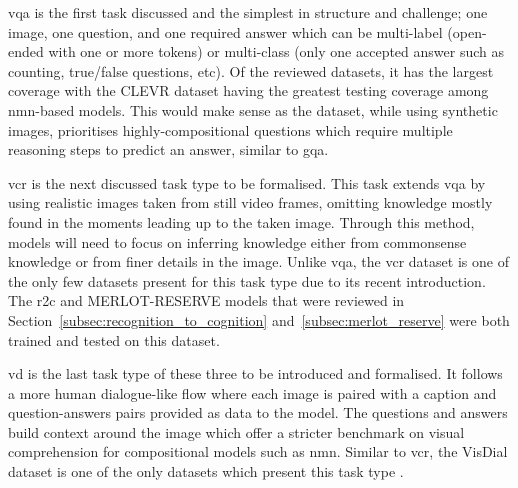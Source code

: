 \gls{vqa} is the first task discussed and the simplest in structure and challenge; one image, one question, and one required answer which can be multi-label (open-ended with one or more tokens) or multi-class (only one accepted answer such as counting, true/false questions, etc).
Of the reviewed datasets, it has the largest coverage \cite{andreas_deep_2016,agrawal_vqa_2016,johnson_clevr_2016,hudson_gqa_2019} with the CLEVR dataset having the greatest testing coverage among \gls{nmn}-based models\cite{fishandi_neural_2023}.
This would make sense as the dataset, while using synthetic images, prioritises highly-compositional questions which require multiple reasoning steps to predict an answer, similar to \gls{gqa}.

\gls{vcr} is the next discussed task type to be formalised\cite{zellers_recognition_2019}.
This task extends \gls{vqa} by using realistic images taken from still video frames, omitting knowledge mostly found in the moments leading up to the taken image.
Through this method, models will need to focus on inferring knowledge either from commonsense knowledge or from finer details in the image.
Unlike \gls{vqa}, the \gls{vcr} dataset\cite{zellers_recognition_2019} is one of the only few datasets present for this task type due to its recent introduction.
The \gls{r2c} and MERLOT-RESERVE models that were reviewed in Section~\ref{subsec:recognition_to_cognition} and~\ref{subsec:merlot_reserve} were both trained and tested on this dataset.

\gls{vd} is the last task type of these three to be introduced and formalised\cite{das_visual_2019}.
It follows a more human dialogue-like flow where each image is paired with a caption and question-answers pairs provided as data to the model.
The questions and answers build context around the image which offer a stricter benchmark on visual comprehension for compositional models such as \gls{nmn}.
Similar to \gls{vcr}, the VisDial dataset is one of the only datasets which present this task type \cite{das_visual_2019}.

